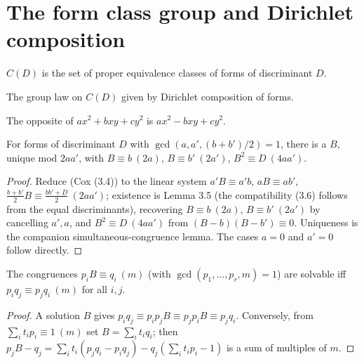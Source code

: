 \section{The form class group and Dirichlet composition}

\begin{definition}
  \label{def:form_class_group}
  \leanok
  $C(D)$ is the set of proper equivalence classes of forms of discriminant $D$.
\end{definition}

\begin{definition}
  \label{def:dirichlet_composition}
  \leanok
  The group law on $C(D)$ given by Dirichlet composition of forms.
\end{definition}

\begin{definition}
  \label{def:opposite_form}
  \leanok
  The opposite of $a x^2 + b x y + c y^2$ is $a x^2 - b x y + c y^2$.
\end{definition}

\begin{lemma}
  \label{lem:l3_2}
  \leanok
  For forms of discriminant $D$ with $\gcd(a,a',(b+b')/2)=1$, there is a $B$, unique
  mod $2aa'$, with $B \equiv b\ (2a)$, $B \equiv b'\ (2a')$, $B^2 \equiv D\ (4aa')$.
\end{lemma}
\begin{proof}\leanok
{}
Reduce (Cox (3.4)) to the linear system $a'B\equiv a'b$, $aB\equiv ab'$,
$\tfrac{b+b'}{2} B\equiv\tfrac{bb'+D}{2}\ (2aa')$; existence is Lemma 3.5 (the
compatibility (3.6) follows from the equal discriminants), recovering $B\equiv b\
(2a)$, $B\equiv b'\ (2a')$ by cancelling $a', a$, and $B^2\equiv D\ (4aa')$ from
$(B-b)(B-b')\equiv 0$. Uniqueness is the companion simultaneous-congruence lemma.
The cases $a=0$ and $a'=0$ follow directly.
\end{proof}

\begin{lemma}
  \label{lem:l3_5}
  \leanok
  The congruences $p_i B \equiv q_i\ (m)$ (with $\gcd(p_1,\dots,p_r,m)=1$) are
  solvable iff $p_i q_j \equiv p_j q_i\ (m)$ for all $i,j$.
\end{lemma}
\begin{proof}\leanok
  A solution $B$ gives $p_i q_j \equiv p_i p_j B \equiv p_j p_i B \equiv
  p_j q_i$. Conversely, from $\sum_i t_i p_i \equiv 1\ (m)$ set $B = \sum_i t_i q_i$;
  then $p_j B - q_j = \sum_i t_i (p_j q_i - p_i q_j) - q_j(\sum_i t_i p_i - 1)$ is a
  sum of multiples of $m$.
\end{proof}


